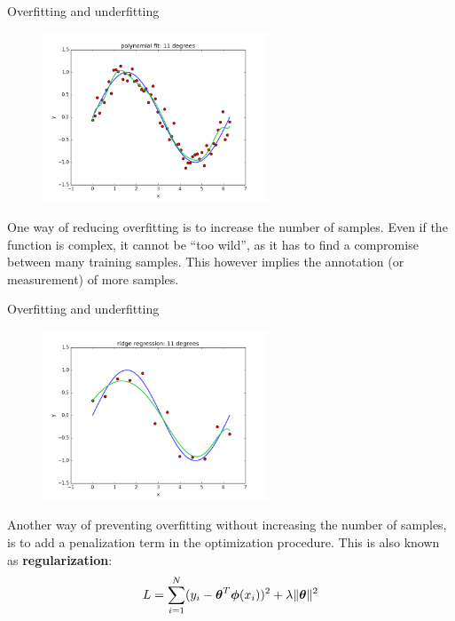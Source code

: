 \documentclass[xcolor=pdftex,dvipsnames,table]{beamer}
\begin{document}
\begin{frame}{Overfitting and underfitting}
\begin{figure}[htb]
\includegraphics[width=0.6\textwidth]{../graphics/polyfit_degree_11_N60.png}
\end{figure}
One way of reducing overfitting is to increase the number of samples. Even if the function is complex, it cannot be “too wild”, as it has to find a compromise between many training samples. This however implies the annotation (or measurement) of more samples. 
\end{frame}

\begin{frame}{Overfitting and underfitting}
\begin{figure}[htb]
\includegraphics[width=0.6\textwidth]{../graphics/ridge_regression_11_10.png}
\end{figure}
Another way of preventing overfitting without increasing the number of samples, is to add a penalization term in the optimization procedure. This is also known as \textbf{regularization}:
\begin{equation}
	L = \sum_{i=1}^N (y_i - \boldsymbol{\theta}^T \boldsymbol{\phi} (x_i))^2 + \lambda \| \boldsymbol{\theta} \|^2
\end{equation}
\end{frame}
\end{document}
